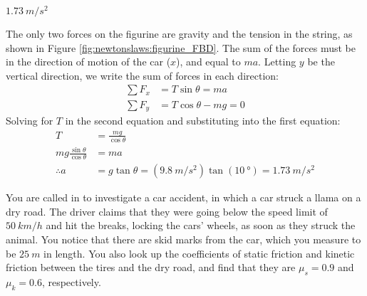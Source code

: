 \begin{finalanswer}
$\SI{1.73}{m/s^2}$
\end{finalanswer}
\begin{solution}
The only two forces on the figurine are gravity and the tension in the string, as shown in Figure \ref{fig:newtonslaws:figurine_FBD}.
The sum of the forces must be in the direction of motion of the car ($x$), and equal to $ma$. Letting $y$ be the vertical direction, we write the sum of forces in each direction:
\begin{align*}
\sum F_x &= T\sin\theta = ma\\
\sum F_y &= T\cos\theta-mg = 0
\end{align*}
Solving for $T$ in the second equation and substituting into the first equation:
\begin{align*}
 T&=\frac{mg}{\cos\theta}\\
 mg\frac{\sin\theta}{\cos\theta}&=ma\\
\therefore a&=g\tan\theta=(\SI{9.8}{m/s^2})\tan(\SI{10}{\degree})=\SI{1.73}{m/s^2}
\end{align*}
\end{solution}

\question You are called in to investigate a car accident, in which a car struck a llama on a dry road. The driver claims that they were going below the speed limit of $\SI{50}{km/h}$ and hit the breaks, locking the cars' wheels, as soon as they struck the animal. You notice that there are skid marks from the car, which you  measure to be $\SI{25}{m}$ in length. You also look up the coefficients of static friction and kinetic friction between the tires and the dry road, and find that they are $\mu_s=0.9$ and $\mu_k=0.6$, respectively.

